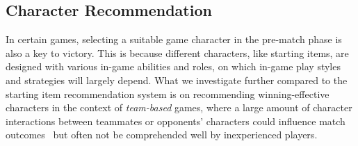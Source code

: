 
\subsection{Character Recommendation}
In certain games, selecting a suitable game character in the pre-match phase is also a key to victory. This is because different characters, like starting items, are designed with various in-game abilities and roles, on which in-game play styles and strategies will largely depend. What we investigate further compared to the starting item recommendation system is on recommending winning-effective characters in the context of \textit{team-based} games, where a large amount of character interactions between teammates or opponents' characters could influence match outcomes~\cite{pobie1,Semenov2016,kim2016proficiency} but often not be comprehended well by inexperienced players.


